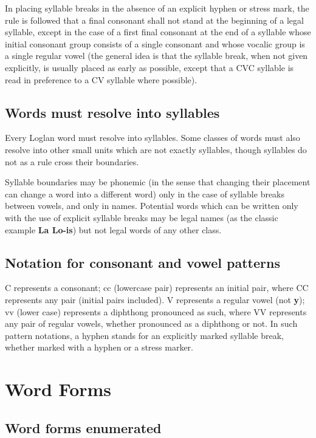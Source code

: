 \documentclass[12pt]{book}
\begin{document}
\begin{enumerate}
In placing syllable breaks in the absence of an explicit hyphen or stress mark, the rule is followed that a final consonant shall not stand at the beginning of a legal syllable, except in the case of a first final consonant at the end of a syllable whose initial consonant group consists of a single consonant and whose vocalic group is a single regular vowel (the general idea is that the syllable break, when not given explicitly, is usually placed as early as possible, except that a CVC syllable is read in preference to a CV syllable where possible).   

\end{enumerate}

\subsection{Words must resolve into syllables}

Every Loglan word must resolve into syllables.  Some classes of words must also resolve into other small units which are not exactly syllables, though syllables do not as a rule cross their boundaries.

Syllable boundaries may be phonemic (in the sense that changing their placement can change a word into a different word) only in the case of syllable breaks between vowels, and only in names.   Potential words which can be written only with the use of explicit syllable breaks may be legal names (as the classic example {\bf La Lo-is}) but not legal words of any other class.

\subsection{Notation for consonant and vowel patterns}

C represents a consonant; cc (lowercase pair) represents an initial pair, where CC represents any pair (initial pairs included).  V represents a regular vowel (not {\bf y}); vv (lower case) represents a diphthong pronounced as such, where VV represents any pair of regular vowels, whether pronounced as a diphthong or not.  In such pattern notations, a hyphen stands for an explicitly marked syllable break, whether marked with a hyphen or a stress marker.

\section{Word Forms}

\subsection{Word forms enumerated}
\end{document}
